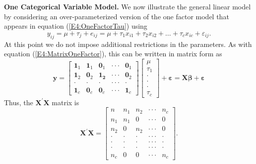 \textbf{One Categorical Variable Model.} We now illustrate the
general linear model by considering an over-parameterized version of
the one factor model that appears in equation
(\ref{E4:OneFactorTau}) using
\begin{equation*}
y_{ij}=\mu +\tau_{j}+e_{ij}=\mu +\tau_1x_{i1}+\tau
_2x_{i2}+\ldots+\tau_cx_{ic}+\varepsilon_{ij}.
\end{equation*}
At this point we do not impose additional restrictions in the
parameters. As with equation (\ref{E4:MatrixOneFactor}), this can be
written in matrix form as
\begin{equation*}
\mathbf{y}=
\begin{bmatrix}
\mathbf{1}_1 & \mathbf{1}_1 & \mathbf{0}_1 & \cdot
\cdot \cdot  & \mathbf{0}_1 \\
\mathbf{1}_2 & \mathbf{0}_2 & \mathbf{1}_{\mathbf{2}} & \cdot
\cdot \cdot  & \mathbf{0}_2 \\
\cdot  & \cdot  & \cdot  & \cdot \cdot \cdot  & \cdot  \\
\mathbf{1}_c & \mathbf{0}_c & \mathbf{0}_c & \cdot \cdot \cdot  &
\mathbf{1}_c
\end{bmatrix}
\begin{bmatrix}
\mu  \\
\tau_1 \\
\cdot  \\
\cdot  \\
\cdot  \\
\tau_c
\end{bmatrix}
+\boldsymbol \varepsilon = \mathbf{X \boldsymbol \beta +\boldsymbol
\varepsilon}
\end{equation*}
Thus, the $\mathbf{X}^{\prime}\mathbf{X}$ matrix is
\begin{equation*}
\mathbf{X}^{\prime}\mathbf{X}=%
\begin{bmatrix}
n & n_1 & n_2 & \cdot \cdot \cdot  & n_c \\
n_1 & n_1 & 0 & \cdot \cdot \cdot  & 0 \\
n_2 & 0 & n_2 & \cdot \cdot \cdot  & 0 \\
\cdot  & \cdot  & \cdot  & \cdot \cdot \cdot  & \cdot  \\
\cdot  & \cdot  & \cdot  & \cdot \cdot \cdot  & \cdot  \\
\cdot  & \cdot  & \cdot  & \cdot \cdot \cdot  & \cdot  \\
n_c & 0 & 0 & \cdot \cdot \cdot  & n_c%
\end{bmatrix}.
\end{equation*}

